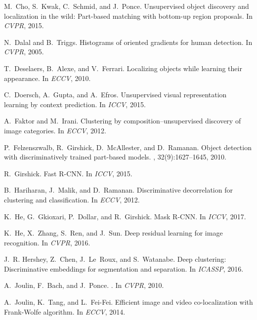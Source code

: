 \documentclass[10pt,twocolumn,letterpaper]{article}
\numberwithin{theorem}{section}
\begin{document}
\begin{thebibliography}{10}
M.~Cho, S.~Kwak, C.~Schmid, and J.~Ponce.
\newblock Unsupervised object discovery and localization in the wild:
  Part-based matching with bottom-up region proposals.
\newblock In {\em CVPR}, 2015.

N.~Dalal and B.~Triggs.
\newblock Histograms of oriented gradients for human detection.
\newblock In {\em CVPR}, 2005.

T.~Deselaers, B.~Alexe, and V.~Ferrari.
\newblock Localizing objects while learning their appearance.
\newblock In {\em ECCV}, 2010.

C.~Doersch, A.~Gupta, and A.~Efros.
\newblock Unsupervised visual representation learning by context prediction.
\newblock In {\em ICCV}, 2015.

A.~Faktor and M.~Irani.
\newblock Clustering by composition--unsupervised discovery of image
  categories.
\newblock In {\em ECCV}, 2012.

P.~Felzenszwalb, R.~Girshick, D.~McAllester, and D.~Ramanan.
\newblock Object detection with discriminatively trained part-based models.
,
  32(9):1627--1645, 2010.

R.~Girshick.
\newblock Fast {R}-{CNN}.
\newblock In {\em ICCV}, 2015.

B.~Hariharan, J.~Malik, and D.~Ramanan.
\newblock Discriminative decorrelation for clustering and classification.
\newblock In {\em ECCV}, 2012.

K.~He, G.~Gkioxari, P.~Dollar, and R.~Girshick.
\newblock Mask {R-CNN}.
\newblock In {\em ICCV}, 2017.

K.~He, X.~Zhang, S.~Ren, and J.~Sun.
\newblock Deep residual learning for image recognition.
\newblock In {\em CVPR}, 2016.

J.~R. Hershey, Z.~Chen, J.~Le~Roux, and S.~Watanabe.
\newblock Deep clustering: Discriminative embeddings for segmentation and
  separation.
\newblock In {\em ICASSP}, 2016.

A.~Joulin, F.~Bach, and J.~Ponce.
.
\newblock In {\em CVPR}, 2010.

A.~Joulin, K.~Tang, and L.~Fei-Fei.
\newblock Efficient image and video co-localization with {Frank-Wolfe}
  algorithm.
\newblock In {\em ECCV}, 2014.


\end{thebibliography}
\end{document}
